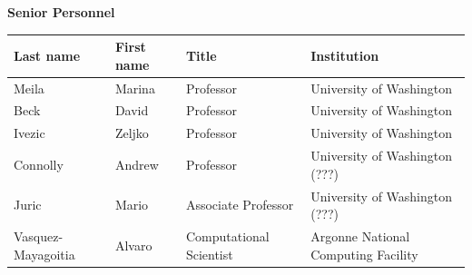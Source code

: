 \documentclass[floatfix,11pt]{article}
\begin{document}
\newpage
\centerline{\textbf{Senior Personnel}}
\begin{tabular}{llll}
  Last name & First name & Title & Institution\\
  \hline
Meila & Marina & Professor & University of Washington\\
Beck & David & Professor &  University of Washington\\
Ivezic & Zeljko & Professor &  University of Washington \\
Connolly & Andrew & Professor &  University of Washington (???)\\
Juric & Mario & Associate Professor &  University of Washington (???)\\
Vasquez-Mayagoitia & Alvaro & Computational Scientist & Argonne National Computing Facility\\
\end{tabular}

\vspace{0.4em}
\begin{tabular}{llll}

\end{tabular}
\end{document}
